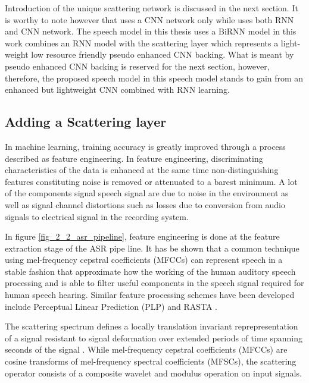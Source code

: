 Introduction of the unique scattering network is discussed in the next section.  It is worthy to note however that \cite{kunze2017transfer} uses a CNN network only while \citep{amodei2016deep} uses both RNN and CNN network.  The speech model in this thesis uses a BiRNN model in this work combines an RNN model with the scattering layer which represents a light-weight low resource friendly pseudo enhanced CNN backing.  What is meant by pseudo enhanced CNN backing is reserved for the next section, however, therefore, the proposed speech model in this speech model stands to gain from an enhanced but lightweight CNN combined with RNN learning.

\subsection{Adding a Scattering layer}

In machine learning, training accuracy is greatly improved through a process described as feature engineering.  In feature engineering, discriminating characteristics of the data is enhanced at the same time non-distinguishing features constituting noise is removed or attenuated to a barest minimum.  A lot of the components signal speech signal are due to noise in the environment as well as signal channel distortions such as losses due to conversion from audio signals to electrical signal in the recording system.

In figure \ref{fig_2_2_asr_pipeline}, feature engineering is done at the feature extraction stage of the ASR pipe line. It has be shown that a common technique using mel-frequency cepstral coefficients (MFCCs) \citep{davis1990comparison} can represent speech in a stable fashion that approximate how the working of the human auditory speech processing and is able to filter useful components in the speech signal required for human speech hearing. Similar feature processing schemes have been developed include Perceptual Linear Prediction (PLP) \citep{hermansky1990perceptual} and RASTA \citep{hermansky1994rasta}. 

The scattering spectrum defines a locally translation invariant reprepresentation of a signal resistant to signal deformation over extended periods of time spanning seconds of the signal \citep{anden2014deep}. While mel-frequency cepstral coefficients (MFCCs) are cosine transforms of mel-frequency spectral coefficients (MFSCs), the scattering operator consists of a composite wavelet and modulus operation on input signals. 

